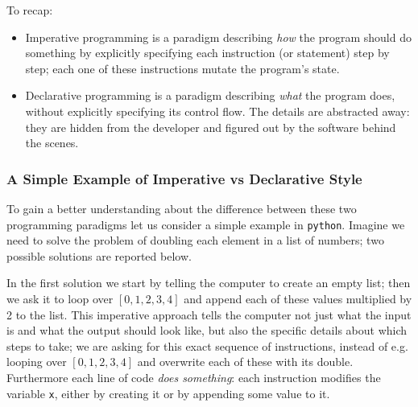 To recap: 
\begin{itemize}
    \item Imperative programming is a paradigm describing \emph{how} the program should do something by explicitly specifying each instruction (or statement) step by step; each one of these instructions mutate the program's state.
    \item Declarative programming is a paradigm describing \emph{what} the program does, without explicitly specifying its control flow. The details are abstracted away: they are hidden from the developer and figured out by the software behind the scenes.
\end{itemize}

\subsubsection{A Simple Example of Imperative vs Declarative Style}
To gain a better understanding about the difference between these two programming paradigms let us consider a simple example in \texttt{python}. Imagine we need to solve the problem of doubling each element in a list of numbers; two possible solutions are reported below.

In the first solution we start by telling the computer to create an empty list; then we ask it to loop over $[0, 1, 2, 3, 4]$ and append each of these values multiplied by 2 to the list. This imperative approach tells the computer not just what the input is and what the output should look like, but also the specific details about which steps to take; we are asking for this exact sequence of instructions, instead of e.g. looping over $[0, 1, 2, 3, 4]$ and overwrite each of these with its double. Furthermore each line of code \emph{does something}: each instruction modifies the variable \texttt{x}, either by creating it or by appending some value to it.


